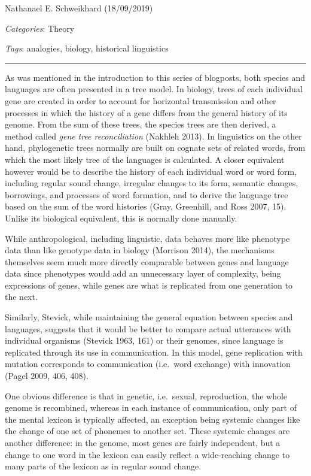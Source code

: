 \documentclass[
  a4paper,
  14pt,
  oneside,
  tablecaptionabove
]{scrbook}
\begin{document}
Nathanael E. Schweikhard (18/09/2019)

\emph{Categories}: Theory

\emph{Tags}: analogies, biology, historical linguistics

\begin{center}\rule{0.5\linewidth}{1pt}\end{center}

As was mentioned in the introduction to this series of blogposts, both
species and languages are often presented in a tree model. In biology,
trees of each individual gene are created in order to account for
horizontal transmission and other processes in which the history of a
gene differs from the general history of its genome. From the sum of
these trees, the species trees are then derived, a method called
\emph{gene} \emph{tree reconciliation} (Nakhleh 2013). In linguistics on
the other hand, phylogenetic trees normally are built on cognate sets of
related words, from which the most likely tree of the languages is
calculated. A closer equivalent however would be to describe the history
of each individual word or word form, including regular sound change,
irregular changes to its form, semantic changes, borrowings, and
processes of word formation, and to derive the language tree based on
the sum of the word histories (Gray, Greenhill, and Ross 2007, 15).
Unlike its biological equivalent, this is normally done manually.

While anthropological, including linguistic, data behaves more like
phenotype data than like genotype data in biology (Morrison 2014), the
mechanisms themselves seem much more directly comparable between genes
and language data since phenotypes would add an unnecessary layer of
complexity, being expressions of genes, while genes are what is
replicated from one generation to the next.

Similarly, Stevick, while maintaining the general equation between
species and languages, suggests that it would be better to compare
actual utterances with individual organisms (Stevick 1963, 161) or their
genomes, since language is replicated through its use in communication.
In this model, gene replication with mutation corresponds to
communication (i.e.~word exchange) with innovation (Pagel 2009, 406,
408).

One obvious difference is that in genetic, i.e.~sexual, reproduction,
the whole genome is recombined, whereas in each instance of
communication, only part of the mental lexicon is typically affected, an
exception being systemic changes like the change of one set of phonemes
to another set. These systemic changes are another difference: in the
genome, most genes are fairly independent, but a change to one word in
the lexicon can easily reflect a wide-reaching change to many parts of
the lexicon as in regular sound change.
\end{document}
